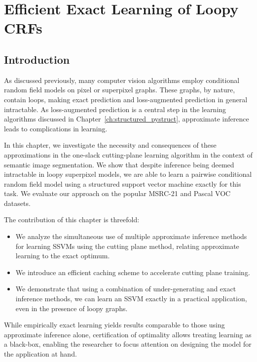 \chapter{Efficient Exact Learning of Loopy CRFs}

\section{Introduction}
As discussed previously, %
 many computer vision algorithms employ conditional random
field models on pixel or superpixel graphs. These graphs, by nature, contain loops,
making exact prediction and loss-augmented prediction in general intractable.
As loss-augmented prediction is a central step in the learning algorithms
discussed in Chapter~\ref{ch:structured_pystruct}, approximate inference leads
to complications in learning.

In this chapter, we investigate the necessity and consequences of these
approximations in the one-slack cutting-plane learning algorithm in the context of semantic
image segmentation. We show that despite inference being deemed intractable in
loopy superpixel models, we are able to learn a pairwise conditional random
field model using a structured support vector machine exactly for this task.
We evaluate our approach on the popular MSRC-21 and Pascal VOC datasets. %

The contribution of this chapter is threefold:
\begin{itemize}
    \item We analyze the simultaneous use of multiple approximate inference
        methods for learning SSVMs using the cutting plane method, relating
        approximate learning to the exact optimum. %
    \item We introduce an efficient caching scheme to accelerate cutting plane
        training.
    \item We demonstrate that using a combination of under-generating and exact
        inference methods, we can learn an SSVM exactly in a practical
        application, even in the presence of loopy graphs.
\end{itemize}

While empirically exact learning yields results comparable to those using
approximate inference alone, certification of optimality allows treating
learning as a black-box, enabling the researcher to focus attention on
designing the model for the application at hand.


